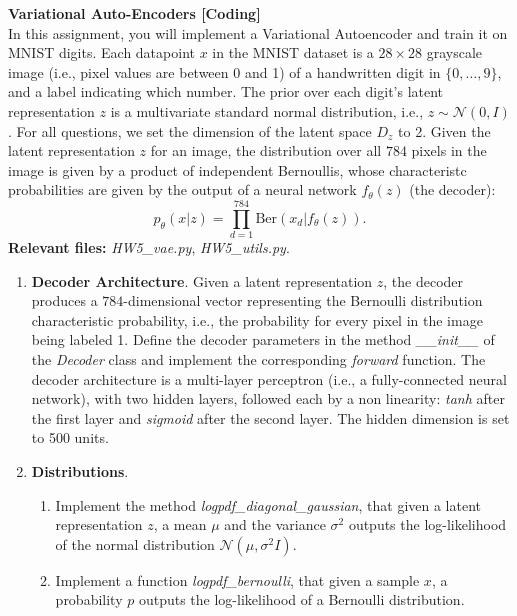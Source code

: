 \begin{Q}
\textbf{\Large Variational Auto-Encoders [Coding]}\\

In this assignment, you will implement a Variational Autoencoder and train it on  MNIST
digits. Each datapoint $x$ in the MNIST dataset is a $28 \times 28$ grayscale image (i.e., pixel values are between 0 and 1) of a handwritten digit in $\{0, \dots, 9\}$, and a label indicating which number. The prior over each digit's latent representation $z$ is a multivariate standard normal distribution, i.e., $z \sim \mathcal{N}(0,I) $. For all questions, we set the dimension of the latent space $D_z$ to 2. Given the latent representation $z$ for an image, the distribution over all $784$ pixels in the image is given by a product of independent Bernoullis, whose characteristc probabilities are given by the output of a neural network $f_{\theta}(z)$ (the decoder):
\begin{equation}
p_{\theta}(x|z) = \prod_{d=1}^{784} \text{Ber}(x_{d}|f_{\theta}(z) ).
\end{equation}
\textbf{Relevant files: } \textit{HW5\_vae.py}, \textit{HW5\_utils.py}.

\begin{enumerate}
\item  \textbf{Decoder Architecture}.
Given a latent representation $z$, the decoder produces a $784$-dimensional vector representing the Bernoulli distribution characteristic probability, i.e., the probability for every pixel in the image being labeled 1. Define the decoder parameters in the method \textit{\_\_init\_\_}  of the \textit{Decoder} class and implement the corresponding \textit{forward} function. The decoder architecture is a multi-layer perceptron (i.e., a fully-connected neural network), with two hidden layers, followed each by a non linearity: \textit{tanh} after the first layer and \textit{sigmoid} after the second layer. The hidden dimension is set to 500 units.

\item \textbf{Distributions}.
\begin{enumerate}
\item Implement the method \textit{logpdf\_diagonal\_gaussian}, that given a latent representation $z$, a mean $\mu$ and the variance $\sigma^2$ outputs the log-likelihood of the normal distribution  $\mathcal{N}(\mu,\sigma^2 I)$.

\item  Implement a function \textit{logpdf\_bernoulli}, that given a sample $x$, a probability $p$  outputs the log-likelihood of a Bernoulli distribution.


\end{enumerate}
\end{enumerate}
\end{Q}
